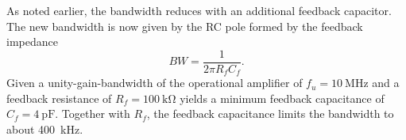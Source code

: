 As noted earlier, the bandwidth reduces with an additional feedback capacitor.
The new bandwidth is now given by the RC pole formed by the feedback impedance
\begin{equation}
	BW=\frac{1}{2\pi R_fC_f}.
\end{equation}
Given a unity-gain-bandwidth of the operational amplifier of $f_u=\SI{10}{\mega\hertz}$ and a feedback resistance of $R_f=\SI{100}{\kilo\ohm}$  yields a minimum feedback capacitance of $C_f=\SI{4}{\pico\farad}$.
Together with $R_f$, the feedback capacitance limits the bandwidth to about \SI{400}{\kilo\hertz}.


